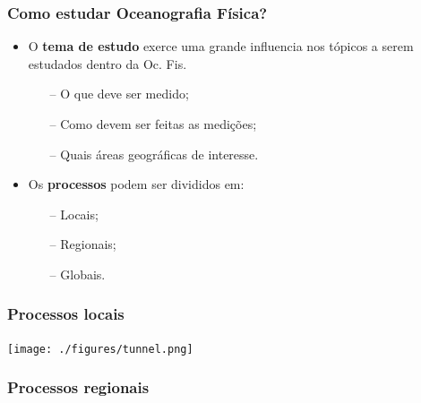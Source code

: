 \begin{frame}
    \frametitle{Como estudar Oceanografia Física?}
    \begin{itemize}[<+-| alert@+>]
        \item O {\bf tema de estudo} exerce uma grande influencia nos tópicos a
              serem estudados dentro da Oc. Fis.
            \begin{enumerate}[<+-| alert@+>]
                \item[--]O que deve ser medido;
                \item[--]Como devem ser feitas as medições;
                \item[--]Quais áreas geográficas de interesse.
            \end{enumerate}
        \item Os {\bf processos} podem ser divididos em:
            \begin{enumerate}[<+-| alert@+>]
                \item[--]Locais;
                \item[--]Regionais;
                \item[--]Globais.
            \end{enumerate}
    \end{itemize}
\end{frame}

\begin{frame}
    \frametitle{Processos locais}
    \begin{center}
      \texttt{[image: ./figures/tunnel.png]}
    \end{center}
\end{frame}

\begin{frame}
    \frametitle{Processos regionais}
    \begin{center}
    \end{center}
\end{frame}


